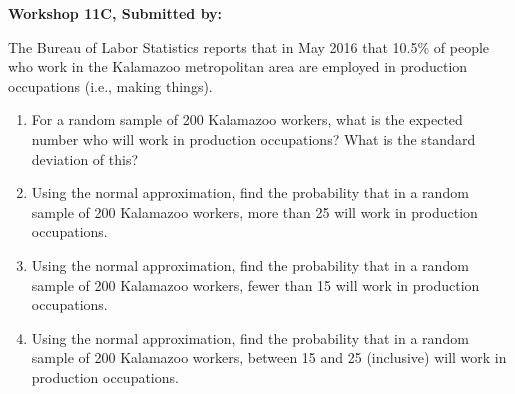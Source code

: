 \documentclass[11pt]{book}\usepackage[]{graphicx}\usepackage[]{color}
\begin{document}
\begin{exercises}
\begin{solution}
\end{solution}

\clearpage

    \begin{exercise}  %

    \begin{center}
\begin{flushleft}\textbf{\large \hfill Workshop 11C, Submitted by: }\end{flushleft}

\end{center}

The Bureau of Labor Statistics reports that in May 2016 that 10.5\% of people who work in the Kalamazoo metropolitan area are employed in production occupations (i.e., making things).

\begin{enumerate}
\item For a random sample of 200 Kalamazoo workers, what is the expected number who will work in production occupations? What is the standard deviation of this?
\item Using the normal approximation, find the probability that in a random sample of 200 Kalamazoo workers, more than 25 will work in production occupations.
\item Using the normal approximation, find the probability that in a random sample of 200 Kalamazoo workers, fewer than 15 will work in production occupations.
\item Using the normal approximation, find the probability that in a random sample of 200 Kalamazoo workers, between 15 and 25 (inclusive) will work in production occupations.
\end{enumerate}

\end{exercise}
\begin{solution}      %


\end{solution}








\end{exercises}
\end{document}
